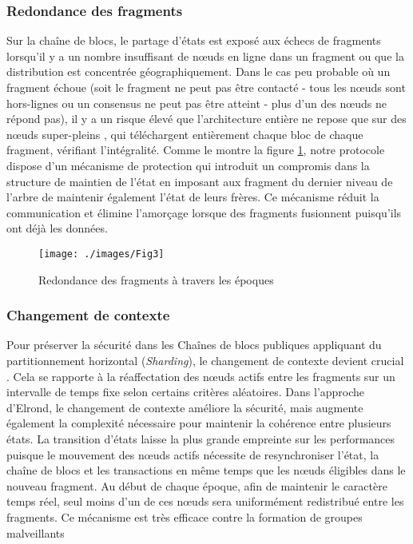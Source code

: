\documentclass[journal]{IEEEtran}
\begin{document}
 
\subsubsection{Redondance des fragments}

Sur la chaîne  de blocs, le partage d'états est exposé aux échecs de fragments lorsqu'il y a un nombre insuffisant de nœuds en ligne dans un fragment ou que la distribution est concentrée géographiquement. Dans le cas peu probable où un fragment échoue (soit le fragment ne peut pas être contacté - tous les nœuds sont hors-lignes ou un consensus ne peut pas être atteint - plus d'un des nœuds ne répond pas), il y a un risque élevé que l'architecture entière ne repose que sur des nœuds super-pleins \cite{2}, qui téléchargent entièrement chaque bloc de chaque fragment, vérifiant l'intégralité. Comme le montre la figure \ref{Fig.3}, notre protocole dispose d'un mécanisme de protection qui introduit un compromis dans la structure de maintien de l'état en imposant aux fragment du dernier niveau de l'arbre de maintenir également l'état de leurs frères. Ce mécanisme réduit la communication et élimine l’amorçage lorsque des  fragments fusionnent puisqu'ils ont déjà les données.

\begin{figure}
	\texttt{[image: ./images/Fig3]} %
	\caption{Redondance des fragments à travers les époques} %
	\label{Fig.3} %
\end{figure}

\subsubsection{Changement de contexte}

Pour préserver la sécurité dans les Chaînes de blocs publiques appliquant du partitionnement horizontal (\textit{Sharding}), le changement de contexte devient crucial \cite{7}. Cela se rapporte à la réaffectation des nœuds actifs entre les fragments sur un intervalle de temps fixe selon certains critères aléatoires. Dans l'approche d'Elrond, le changement de contexte améliore la sécurité, mais augmente également la complexité nécessaire pour maintenir la cohérence entre plusieurs états. La transition d'états laisse la plus grande empreinte sur les performances puisque le mouvement des nœuds actifs nécessite de resynchroniser l'état, la chaîne de blocs et les transactions en même temps que les nœuds éligibles dans le nouveau fragment.
Au début de chaque époque, afin de maintenir le caractère temps réel, seul moins d'un de ces nœuds sera uniformément redistribué entre les fragments. Ce mécanisme est très efficace contre la formation de groupes malveillants
\end{document}
